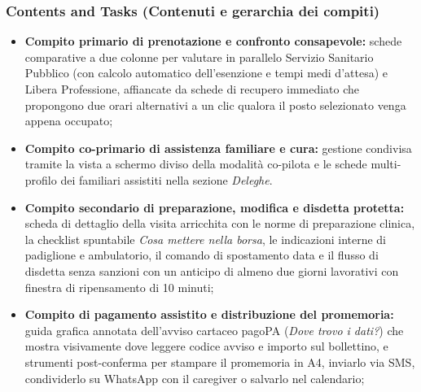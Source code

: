 \subsubsection{Contents and Tasks (Contenuti e gerarchia dei compiti)}
\begin{itemize}
\item \textbf{Compito primario di prenotazione e confronto consapevole:} schede comparative a due colonne per valutare in parallelo Servizio Sanitario Pubblico (con calcolo automatico dell'esenzione e tempi medi d'attesa) e Libera Professione, affiancate da schede di recupero immediato che propongono due orari alternativi a un clic qualora il posto selezionato venga appena occupato;
\item \textbf{Compito co-primario di assistenza familiare e cura:} gestione condivisa tramite la vista a schermo diviso della modalità co-pilota e le schede multi-profilo dei familiari assistiti nella sezione \emph{Deleghe}.
\item \textbf{Compito secondario di preparazione, modifica e disdetta protetta:} scheda di dettaglio della visita arricchita con le norme di preparazione clinica, la checklist spuntabile \emph{Cosa mettere nella borsa}, le indicazioni interne di padiglione e ambulatorio, il comando di spostamento data e il flusso di disdetta senza sanzioni con un anticipo di almeno due giorni lavorativi con finestra di ripensamento di 10 minuti;
\item \textbf{Compito di pagamento assistito e distribuzione del promemoria:} guida grafica annotata dell'avviso cartaceo pagoPA (\emph{Dove trovo i dati?}) che mostra visivamente dove leggere codice avviso e importo sul bollettino, e strumenti post-conferma per stampare il promemoria in A4, inviarlo via SMS, condividerlo su WhatsApp con il caregiver o salvarlo nel calendario;
\end{itemize}

